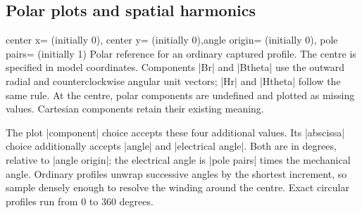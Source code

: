 \subsection{Polar plots and spatial harmonics}
\begin{keylist}{center x= (initially 0),
 center y= (initially 0),angle origin= (initially 0),
 pole pairs= (initially 1)}
Polar reference for an ordinary captured profile. The centre is specified in
model coordinates. Components |Br| and |Btheta| use the outward radial and
counterclockwise angular unit vectors; |Hr| and |Htheta| follow the same rule.
At the centre, polar components are undefined and plotted as missing values.
Cartesian components retain their existing meaning.
\end{keylist}
The plot |component| choice accepts these four additional values. Its
|abscissa| choice additionally accepts |angle| and |electrical angle|.
Both are in degrees, relative to |angle origin|; the electrical angle is
|pole pairs| times the mechanical angle. Ordinary profiles unwrap successive
angles by the shortest increment, so sample densely enough to resolve the
winding around the centre. Exact circular profiles run from 0 to 360 degrees.


